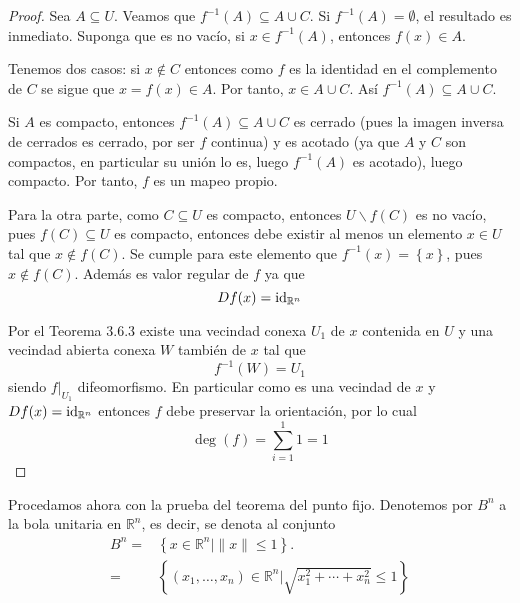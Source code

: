 \documentclass[12pt]{report}
\theoremstyle{largebreak}
\begin{document}
\begin{proof}
    Sea $A\subseteq U$. Veamos que $f^{-1}(A)\subseteq A\cup C$. Si $f^{-1}(A)=\emptyset$, el resultado es inmediato. Suponga que es no vacío, si $x\in f^{-1}(A)$, entonces $f(x)\in A$.

    Tenemos dos casos: si $x\notin C$ entonces como $f$ es la identidad en el complemento de $C$ se sigue que $x = f(x)\in A$. Por tanto, $x\in A\cup C$. Así $f^{-1}(A)\subseteq A\cup C$.

    Si $A$ es compacto, entonces $f^{-1}(A)\subseteq A\cup C$ es cerrado (pues la imagen inversa de cerrados es cerrado, por ser $f$ continua) y es acotado (ya que $A$ y $C$ son compactos, en particular su unión lo es, luego $f^{-1}(A)$ es acotado), luego compacto. Por tanto, $f$ es un mapeo propio.
    
    Para la otra parte, como $C\subseteq U$ es compacto, entonces $U\backslash f(C)$ es no vacío, pues $f(C)\subseteq U$ es compacto, entonces debe existir al menos un elemento $x\in U$ tal que $x\notin f(C)$. Se cumple para este elemento que $f^{-1}(x)=\left\{x\right\}$, pues $x\notin f(C)$. Además es valor regular de $f$ ya que
    \begin{equation*}
        Df(x)=\textup{id}_{\mathbb{R}^n}
    \end{equation*}
    
    Por el Teorema 3.6.3 existe una vecindad conexa $U_1$ de $x$ contenida en $U$ y una vecindad abierta conexa $W$ también de $x$ tal que
    \begin{equation*}
        f^{-1}(W)=U_1
    \end{equation*}
    siendo $f|_{U_1}$ difeomorfismo. En particular como es una vecindad de $x$ y $Df(x)=\textup{id}_{\mathbb{R}^n}$ entonces $f$ debe preservar la orientación, por lo cual
    \begin{equation*}
        \deg(f)=\sum_{i=1}^{1}1=1
    \end{equation*}
\end{proof}

Procedamos ahora con la prueba del teorema del punto fijo. Denotemos por $B^n$ a la bola unitaria en $\mathbb{R}^n$, es decir, se denota al conjunto
\begin{equation*}
    \begin{split}
        B^n=&\left\{x\in\mathbb{R}^n|\|x\|\leq 1\right\}.\\
        =&\left\{(x_1,\dots,x_n)\in\mathbb{R}^n|\sqrt{x_1^2+\cdots+x_n^2}\leq1\right\}
    \end{split}
\end{equation*}
\end{document}
